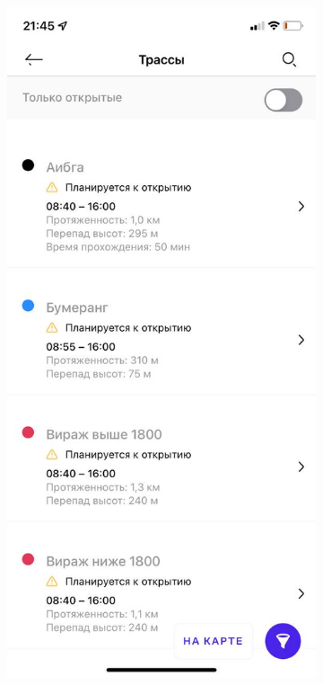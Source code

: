 \begin{figure}[h!]
	\begin{center}
		
		\begin{subfigure}{.33\textwidth}
			\centering
			\includegraphics[width=.95\linewidth]{../imgs/analogue_apps/rslope.png}

\end{subfigure}
\end{center}
\end{figure}
